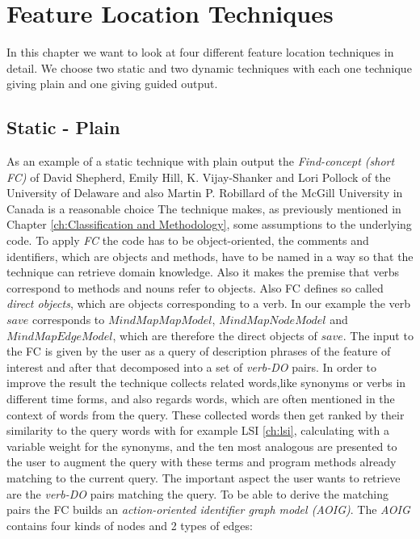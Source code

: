\chapter{Feature Location Techniques}

In this chapter we want to look at four different feature location techniques in detail. We choose two static and two dynamic techniques with each one technique giving plain and one giving guided output.

\section{Static - Plain}
As an example of a static technique with plain output the \emph{Find-concept (short FC)} of David Shepherd, Emily Hill, K. Vijay-Shanker and Lori Pollock of the University of Delaware and also Martin P. Robillard of the McGill University in Canada is a reasonable choice
The technique makes, as previously mentioned in Chapter \ref{ch:Classification and Methodology}, some assumptions to the underlying code. To apply \emph{FC} the code has to be object-oriented, the comments and identifiers, which are objects and methods, have to be named in a way so that the technique can retrieve domain knowledge. Also it makes the premise that verbs correspond to methods and nouns refer to objects. Also FC defines so called \textit{direct objects}, which are objects corresponding to a verb. In our example the verb $save$ corresponds to $MindMapMapModel$, $MindMapNodeModel$ and $MindMapEdgeModel$, which are therefore the direct objects of $save$.\newline
\emptyLine
The input to the FC is given by the user as a query of description phrases of the feature of interest and after that decomposed into a set of \textit{verb-DO} pairs. In order to improve the result the technique collects related words,like synonyms or verbs in different time forms, and also regards words, which are often mentioned in the context of words from the query. These collected words then get ranked by their similarity to the query words with for example LSI \ref{ch:lsi}, calculating with a variable weight for the synonyms, and the ten most analogous are presented to the user to augment the query with these terms and program methods already matching to the current query.\newline
\emptyLine
The important aspect the user wants to retrieve are the \textit{verb-DO} pairs matching the query. To be able to derive the matching pairs the FC builds an \textit{action-oriented identifier graph model (AOIG)}. The \textit{AOIG} contains four kinds of nodes and 2 types of edges:
\vspace{3em} %

